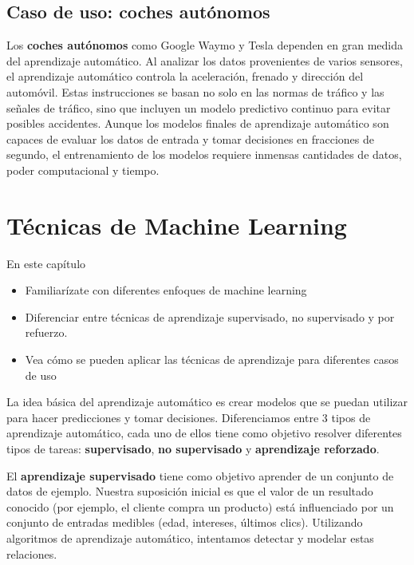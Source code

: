 \documentclass[
]{book}
\providecommand{\tightlist}{%
  \setlength{\itemsep}{0pt}\setlength{\parskip}{0pt}}
\begin{document}
\hypertarget{caso-de-uso-coches-autuxf3nomos}{%
\subsection{Caso de uso: coches autónomos}\label{caso-de-uso-coches-autuxf3nomos}}

Los \textbf{coches autónomos} como Google Waymo y Tesla dependen en gran medida del aprendizaje automático. Al analizar los datos provenientes de varios sensores, el aprendizaje automático controla la aceleración, frenado y dirección del automóvil. Estas instrucciones se basan no solo en las normas de tráfico y las señales de tráfico, sino que incluyen un modelo predictivo continuo para evitar posibles accidentes. Aunque los modelos finales de aprendizaje automático son capaces de evaluar los datos de entrada y tomar decisiones en fracciones de segundo, el entrenamiento de los modelos requiere inmensas cantidades de datos, poder computacional y tiempo.

\hypertarget{tuxe9cnicas-de-machine-learning}{%
\section{Técnicas de Machine Learning}\label{tuxe9cnicas-de-machine-learning}}

En este capítulo

\begin{itemize}
\tightlist
\item
  Familiarízate con diferentes enfoques de machine learning
\item
  Diferenciar entre técnicas de aprendizaje supervisado, no supervisado y por refuerzo.
\item
  Vea cómo se pueden aplicar las técnicas de aprendizaje para diferentes casos de uso
\end{itemize}

La idea básica del aprendizaje automático es crear modelos que se puedan utilizar para hacer predicciones y tomar decisiones. Diferenciamos entre 3 tipos de aprendizaje automático, cada uno de ellos tiene como objetivo resolver diferentes tipos de tareas: \textbf{supervisado}, \textbf{no supervisado} y \textbf{aprendizaje reforzado}.

El \textbf{aprendizaje supervisado} tiene como objetivo aprender de un conjunto de datos de ejemplo. Nuestra suposición inicial es que el valor de un resultado conocido (por ejemplo, el cliente compra un producto) está influenciado por un conjunto de entradas medibles (edad, intereses, últimos clics). Utilizando algoritmos de aprendizaje automático, intentamos detectar y modelar estas relaciones.
\end{document}
